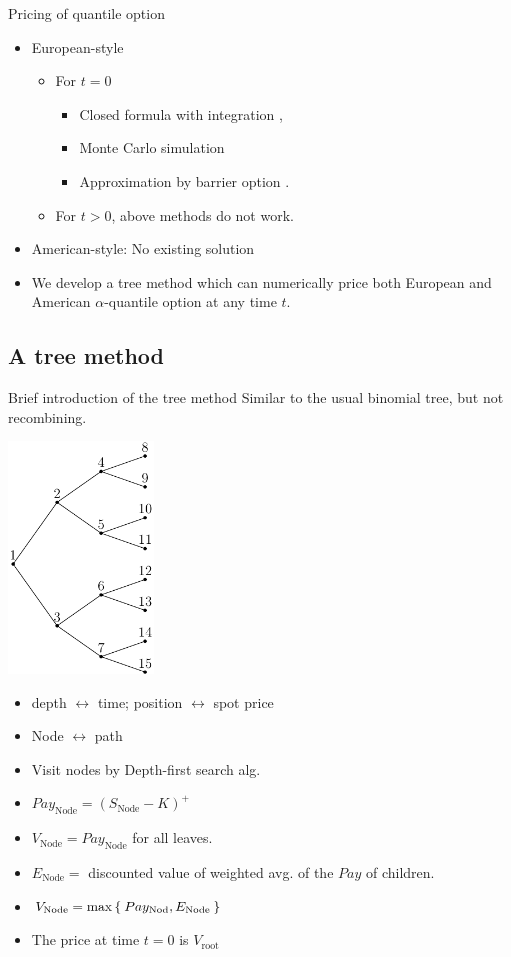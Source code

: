 \documentclass[cjk,10pt]{beamer}
\begin{document}
\begin{frame}{Pricing of quantile option}
\begin{itemize}
\item
European-style
\begin{itemize}
\item For $t=0$
  \begin{itemize}
  \item Closed formula with integration \cite{Dassios1995},
  \item Monte Carlo simulation \cite{Laura2001}
  \item Approximation by barrier option \cite{Kwok2001}.
  \end{itemize}
\item For $t> 0$, above methods do not work.  
\end{itemize}
\item
American-style: No existing solution
\item
We develop a tree method which can numerically price both European and American 
$\alpha$-quantile option at any time $t$.  
\end{itemize}
\end{frame}

\subsection{A tree method}
\begin{frame}{Brief introduction of the tree method}
Similar to the usual binomial tree, but not recombining.

\includegraphics[width=0.29\textwidth]{bitree.pdf}
\parbox[b]{0.7\textwidth}{
\begin{itemize}
\item depth $\leftrightarrow$ time; position $\leftrightarrow$ spot price 
\item Node $\leftrightarrow$ path 
\item Visit nodes by Depth-first search alg.
\item $Pay_{\text{Node}} = (S_{\text{Node}}-K)^+$
\item $V_{\text{Node}} = Pay_{\text{Node}}$ for all leaves.
\item $E_{\text{Node}} =$ discounted value of weighted avg. of 
  the $Pay$ of children.
\item $V_{\text{Node}} = \max\Set{Pay_{\text{Nod}}, E_{\text{Node}}} $
\item The price at time $t=0$ is $V_{\text{root}}$
\end{itemize}
}
\end{frame}
\end{document}
